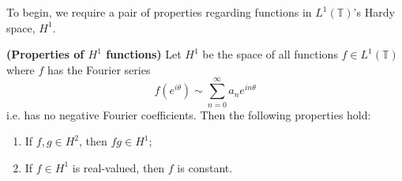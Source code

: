\documentclass[../main.tex]{subfiles}
\begin{document}
To begin, we require a pair of properties regarding functions in
$L^1(\mathbb{T})$'s Hardy space, $H^1$. 

\begin{lemma}{\textbf{(Properties of $H^1$ functions)}}
\label{thm:h1-properties}
  Let $H^1$ be the space of all functions $f \in L^1(\mathbb{T})$ where $f$ has
  the Fourier series
  $$f(e^{i \theta}) \sim \sum_{n=0}^\infty a_n e^{i n \theta}$$
  i.e. has no negative Fourier coefficients. Then the following properties hold:
  \begin{enumerate}
    \item\label{item:h2-products-in-h1} If $f, g \in H^2$, then $fg \in H^1$;
    \item\label{item:f-h1-const} If $f \in H^1$ is real-valued, then $f$ is constant.
  \end{enumerate}
\end{lemma}
\end{document}
